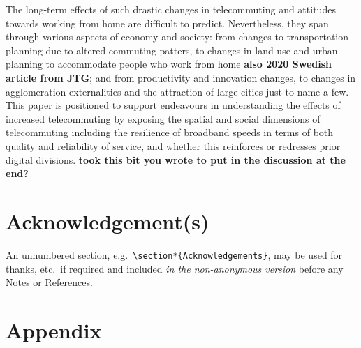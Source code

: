 \documentclass[Royal,times,sageh]{sagej}
\begin{document}
The long-term effects of such drastic changes in telecommuting and
attitudes towards working from home are difficult to predict.
Nevertheless, they span through various aspects of economy and society:
from changes to transportation planning due to altered commuting
patters, to changes in land use and urban planning to accommodate people
who work from home \citep{BUDNITZ2020102713}\textbf{also 2020 Swedish
article from JTG}; and from productivity and innovation changes, to
changes in agglomeration externalities and the attraction of large
cities \citep{econobs} just to name a few. This paper is positioned to
support endeavours in understanding the effects of increased
telecommuting by exposing the spatial and social dimensions of
telecommuting including the resilience of broadband speeds in terms of
both quality and reliability of service, and whether this reinforces or
redresses prior digital divisions. \textbf{took this bit you wrote to
put in the discussion at the end?}

\hypertarget{acknowledgements}{%
\section*{Acknowledgement(s)}\label{acknowledgements}}

An unnumbered section,
e.g.~\texttt{\textbackslash{}section*\{Acknowledgements\}}, may be used
for thanks, etc.~if required and included \emph{in the non-anonymous
version} before any Notes or References.

\hypertarget{sec:appendix}{%
\section{Appendix}\label{sec:appendix}}
\end{document}
